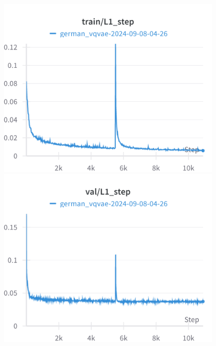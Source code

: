 \begin{figure}[H]
\includegraphics[width=\linewidth]{detailed_engineering/German VQVAE/charts/train_l1_step.png}
\caption{}
\endminipage\hfill
{}
\includegraphics[width=\linewidth]{detailed_engineering/German VQVAE/charts/val_l1_step.png}
\caption{}
\endminipage
\end{figure}

